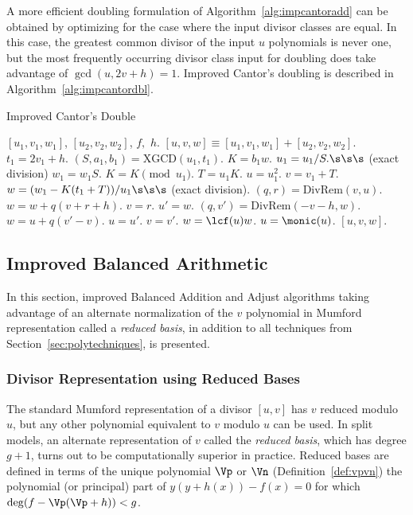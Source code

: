 A more efficient doubling formulation of Algorithm~\ref{alg:impcantoradd} can be
obtained by optimizing for the case where the input divisor classes are equal.
In this case, the greatest common divisor of the input $u$ polynomials is never
one, but the most frequently occurring divisor class input for doubling does
take advantage of $\gcd(u, 2v+h) = 1$. Improved Cantor's doubling is  described
in Algorithm~\ref{alg:impcantordbl}. 
\begin{algorithm}[htbp]
    \caption{Improved Cantor's Double}
    \label{alg:impcantordbl}
    \begin{algorithmic}[1]
    \Require $[u_1,v_1,w_1]$, $[u_2,v_2,w_2]$, $f,$ $h.$
    \Ensure $[u,v,w] \equiv [u_1,v_1,w_1] + [u_2,v_2,w_2]$.
    \vspace{5pt}
    \State $t_1 = 2v_1 + h$.
    \State $(S,a_1,b_1) = \mathrm{XGCD}(u_1,t_1)$.
    \State $K = b_1w$.
        \State $u_1 = u_1/S. \s\s\s$ (exact division) 
        \State $w_1 = w_1S$.
    \EndIf
    \State $K = K \pmod{u_1}$.
    \State $T = u_1K$. 
    \State $u = u_1^2$.
    \State $v = v_1 + T$.
    \State $w = (w_1 - K(t_1 + T))/u_1 \s\s\s$ (exact division).
            \State $(q,r) = \mathrm{DivRem}(v,u)$.
            \State $w = w + q(v + r + h)$.
            \State $v = r$.
        \EndIf
    \Else
            \State $u' = w$.
            \State $(q,v') = \mathrm{DivRem}(-v - h,w)$.
            \State $w = u + q(v' - v)$.
            \State $u = u'$.
            \State $v = v'$.
        \EndWhile
        \State $w = \lcf(u)w$.
        \State $u = \monic(u)$.
    \EndIf
    \State \Return $[u,v,w]$.
    \end{algorithmic}
    \end{algorithm}

    
\subsection{Improved Balanced Arithmetic}\label{sec:balimproved}

In this section, improved Balanced Addition and Adjust algorithms taking
advantage of an alternate normalization of the $v$ polynomial in Mumford
representation called a \emph{reduced basis}, in addition to all techniques from
Section~\ref{sec:polytechniques}, is presented. 

\subsubsection{Divisor Representation using Reduced Bases} \label{sec:reduced}
The standard Mumford representation of a divisor $[u,v]$ has $v$ reduced modulo
$u$, but any other polynomial equivalent to $v$ modulo $u$ can be used.  In
split models, an alternate representation of $v$ called the \emph{reduced
basis}, which has degree $g+1$, turns out to be computationally superior in
practice. Reduced bases are defined in terms of the unique polynomial $\Vp$ or
$\Vn$ (Definition~\ref{def:vpvn}) the polynomial (or principal) part of $y(y +
h(x)) - f(x) = 0$ for which $\deg(f - \Vp(\Vp + h)) < g$. 

